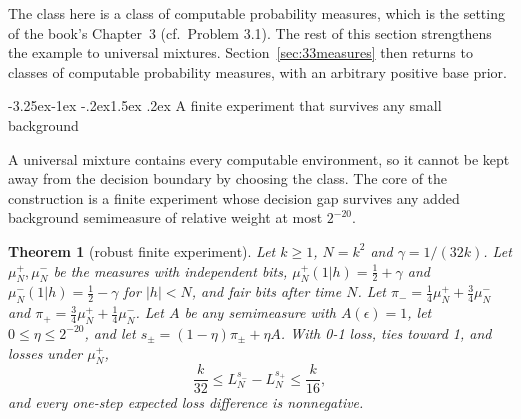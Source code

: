 \documentclass[11pt]{article}
\makeatletter
\renewcommand\subsection{\@startsection{subsection}{2}{\z@}%
  {-3.25ex\@plus -1ex \@minus -.2ex}{1.5ex \@plus .2ex}%
  {\normalfont\large\bfseries\boldmath}}
\newcommand{\eps}{\epsilon}
\newtheorem{theorem}{Theorem}[section]
\theoremstyle{definition}
\theoremstyle{remark}
\makeatother
\begin{document}
The class here is a class of computable
probability measures, which is the setting of the book's Chapter~3
(cf.\ Problem 3.1). The rest of this section strengthens the example to
universal mixtures. Section~\ref{sec:33measures} then returns to classes of
computable probability measures, with an arbitrary positive base prior.

\subsection{A finite experiment that survives any small background}

A universal mixture contains every computable environment, so it cannot be
kept away from the decision boundary by choosing the class. The core of the
construction is a finite experiment whose decision gap survives any added
background semimeasure of relative weight at most $2^{-20}$.

\begin{theorem}[robust finite experiment]\label{thm:robust}
Let $k\ge1$, $N=k^2$ and $\gamma=1/(32k)$. Let $\mu^+_N,\mu^-_N$ be the measures
with independent bits, $\mu^+_N(1|h)=\frac12+\gamma$ and $\mu^-_N(1|h)=\frac12-\gamma$
for $|h|<N$, and fair bits after time $N$. Let
$\pi_-=\frac14\mu^+_N+\frac34\mu^-_N$ and $\pi_+=\frac34\mu^+_N+\frac14\mu^-_N$.
Let $A$ be any semimeasure with $A(\eps)=1$, let $0\le\eta\le2^{-20}$, and let
$s_\pm=(1-\eta)\pi_\pm+\eta A$. With 0-1 loss, ties toward 1, and losses under
$\mu^+_N$,
\[
\frac{k}{32}\le L_N^{s_-}-L_N^{s_+}\le\frac{k}{16},
\]
and every one-step expected loss difference is nonnegative.
\end{theorem}
\end{document}
